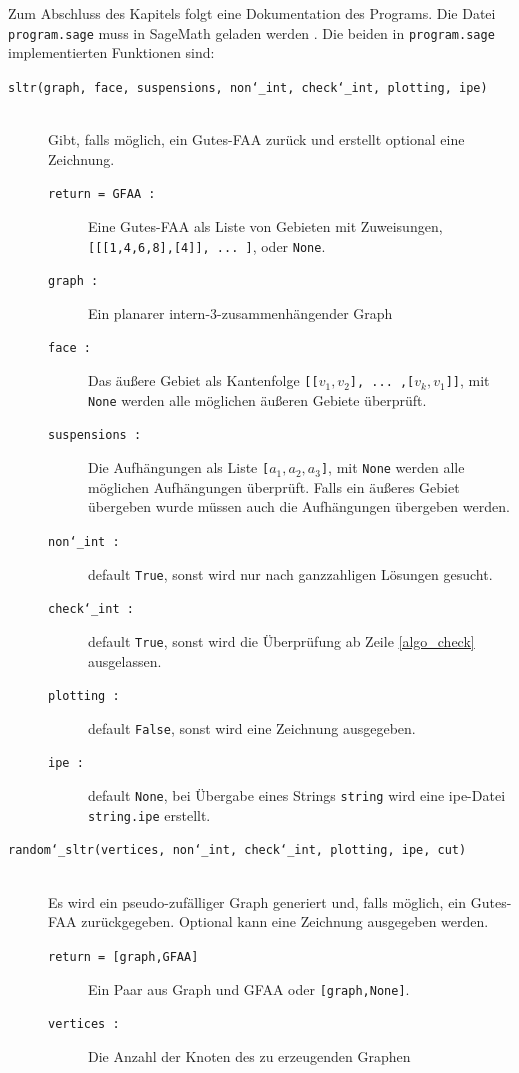 Zum Abschluss des Kapitels folgt eine Dokumentation des Programs. Die Datei \texttt{program.sage} muss in SageMath geladen werden \cite{sage}. Die beiden in \texttt{program.sage} implementierten Funktionen sind:
\begin{description}
\item[\texttt{sltr(graph, face, suspensions, non\char`_int, check\char`_int, plotting, ipe)}] \hfill \\
Gibt, falls möglich, ein Gutes-FAA zurück und erstellt optional eine Zeichnung.
\begin{description}
\item[\texttt{return = GFAA :}] Eine Gutes-FAA als Liste von Gebieten mit Zuweisungen, \texttt{[[[1,4,6,8],[4]], ... ]}, oder \texttt{None}.
\item[\texttt{graph :}] Ein planarer intern-3-zusammenhängender Graph
\item[\texttt{face :}] Das äußere Gebiet als Kantenfolge \texttt{[[$v_1,v_2$], ... ,[$v_k,v_1$]]}, mit \texttt{None} werden alle möglichen äußeren Gebiete überprüft.
\item[\texttt{suspensions :}] Die Aufhängungen als Liste \texttt{[$a_1,a_2,a_3$]}, mit \texttt{None} werden alle möglichen Aufhängungen überprüft. Falls ein äußeres Gebiet übergeben wurde müssen auch die Aufhängungen übergeben werden.
\item[\texttt{non\char`_int :}] default \texttt{True}, sonst wird nur nach ganzzahligen Lösungen gesucht.
\item[\texttt{check\char`_int :}] default \texttt{True}, sonst wird die Überprüfung ab Zeile \ref{algo_check} ausgelassen.
\item[\texttt{plotting :}] default \texttt{False}, sonst wird eine Zeichnung ausgegeben.
\item[\texttt{ipe :}] default \texttt{None}, bei Übergabe eines Strings \texttt{string} wird eine ipe-Datei \texttt{string.ipe} erstellt.
\end{description}
\item[\texttt{random\char`_sltr(vertices, non\char`_int, check\char`_int, plotting, ipe, cut)}] \hfill \\
Es wird ein pseudo-zufälliger Graph generiert und, falls möglich, ein Gutes-FAA zurückgegeben. Optional kann eine Zeichnung ausgegeben werden.
\begin{description}
\item[\texttt{return = [graph,GFAA]}] Ein Paar aus Graph und GFAA oder \texttt{[graph,None]}.
\item[\texttt{vertices :}] Die Anzahl der Knoten des zu erzeugenden Graphen

\end{description}
\end{description}
